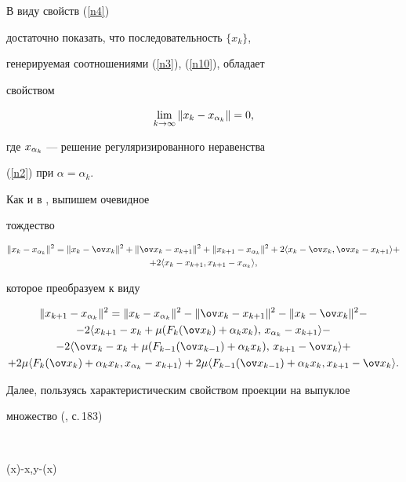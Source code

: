 \begin{pf}


В виду свойств (\ref{n4})


достаточно показать, что последовательность $\{x_k\}$,


генерируемая соотношениями (\ref{n3}), (\ref{n10}), обладает


свойством


$$


\lim_{k\to\infty}\|x_k-\xak\|=0,


$$


где $x_{\alpha_k}$ --- решение регуляризированного неравенства


(\ref{n2}) при $\alpha=\alpha_k$.





Как и в \cite{ant1}, выпишем очевидное


тождество


\begin{multline*}


\D^2=\Bx^2+\Ax^2+\DD^2


+2\lft x_k-\ov x_k,\ov x_k-x_{k+1} \rgt +\\


+2\lft x_k-x_{k+1}, x_{k+1}-\xak\rgt,


\end{multline*}


которое преобразуем к виду


\begin{multline}\label{n18}


\DD^2


= \D^2-\Ax^2-\Bx^2 - \\


 -2\lft x_{k+1}-x_k+\mu(\Fa),\, \xak- x_{k+1}\rgt-\\


 -2\lft\ov x_k-x_k+\mu(\Fb),\, x_{k+1}-\ov x_k \rgt+\\


 + 2\mu\lft \Fa,\xak- x_{k+1} \rgt+


2\mu\lft \Fb,x_{k+1}-\ov x_k \rgt.


\end{multline}


Далее, пользуясь характеристическим свойством проекции на выпуклое


множество (\cite{vasil}, с.\,183)


$$


\lft\px(x)-x,y-\px(x)\rgt{}\quad



\end{pf}
